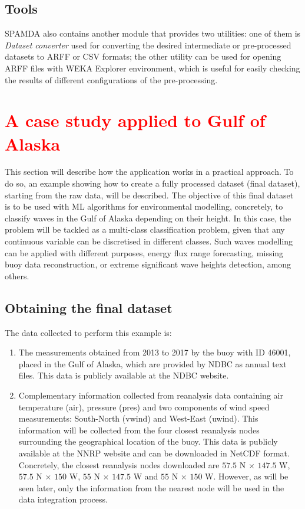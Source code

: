 \documentclass[energies,article,submit,moreauthors,pdftex]{Definitions/mdpi}
\begin{document}
			\subsection{Tools}
			
				SPAMDA also contains another module that provides two utilities: one of them is \textit{Dataset converter} used for converting the desired intermediate or pre-processed datasets to ARFF or CSV formats; the other utility can be used for opening ARFF files with WEKA Explorer environment, which is useful for easily checking the results of different configurations of the pre-processing.
				
	\section{\textcolor{red}{A case study applied to Gulf of Alaska}}\label{sec:CaseStudy}		
		This section will describe how the application works in a practical approach. To do so, an example showing how to create a fully processed dataset (final dataset), starting from the raw data, will be described. The objective of this final dataset is to be used with ML algorithms for environmental modelling, concretely, to classify waves in the Gulf of Alaska depending on their height. In this case, the problem will be tackled as a multi-class classification problem, given that any continuous variable can be discretised in different classes. Such waves modelling can be applied with different purposes, energy flux range forecasting, missing buoy data reconstruction, or extreme significant wave heights detection, among others.
		
		\subsection{Obtaining the final dataset}\label{sec:ObtainingFinalDataset}
		
			The data collected to perform this example is:
			\begin{enumerate}
			\item The measurements obtained from 2013 to 2017 by the buoy with ID 46001, placed in the Gulf of Alaska, which are provided by NDBC as annual text files. This data is publicly available at the NDBC website. 
			\item Complementary information collected from reanalysis data containing air temperature (air), pressure (pres) and two components of wind speed measurements: South-North (vwind) and West-East (uwind). This information will be collected from the four closest reanalysis nodes surrounding the geographical location of the buoy. This data is publicly available at the NNRP website and can be downloaded in NetCDF format. Concretely, the closest reanalysis nodes downloaded are $57.5$ N $\times$ $147.5$ W, $57.5$ N $\times$ $150$ W, $55$ N $\times$ $147.5$ W and $55$ N $\times$ $150$ W. However, as will be seen later, only the information from the nearest node will be used in the data integration process.
			\end{enumerate}
		
\end{document}
